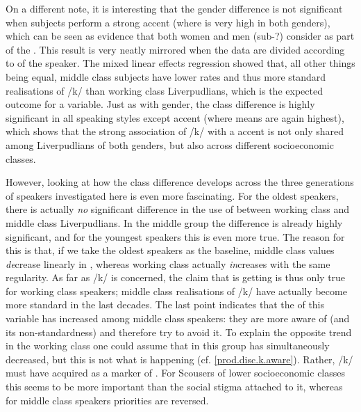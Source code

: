 On a different note, it is interesting that the gender difference is not significant when subjects perform a strong  accent (where  is very high in both genders), which can be seen as evidence that both women and men (sub-?) consider  as part of the  .
This result is very neatly mirrored when the data are divided according to  of the speaker.
The mixed linear effects regression showed that, all other things being equal, middle class subjects have lower  rates and thus more standard realisations of /k/ than working class Liverpudlians, which is the expected outcome for a  variable.
Just as with gender, the class difference is highly significant in all speaking styles except accent  (where  means are again highest), which shows that the strong association of /k/  with a   accent is not only shared among Liverpudlians of both genders, but also across different socioeconomic classes.

However, looking at how the class difference develops across the three generations of speakers investigated here is even more fascinating.
For the oldest speakers, there is actually \emph{no} significant difference in the use of  between working class and middle class Liverpudlians.
In the middle group the difference is already highly significant, and for the youngest speakers this is even more true.
The reason for this is that, if we take the oldest speakers as the baseline, middle class  values \emph{de}crease linearly in , whereas working class  actually \emph{in}creases with the same regularity.
As far as /k/  is concerned, the claim that  is getting  is thus only true for working class speakers; middle class realisations of /k/ have actually become more standard in the last decades.
The last point indicates that the  of this variable has increased among middle class speakers: they are more aware of  (and its non-standardness) and therefore try to avoid it.
To explain the opposite trend in the working class one could assume that  in this group has simultaneously decreased, but this is not what is happening (cf. \ref{prod.disc.k.aware}).
Rather, /k/  must have acquired   as a marker of .
For Scousers of lower socioeconomic classes this   seems to be more important than the social stigma attached to it, whereas for middle class speakers priorities are reversed.

